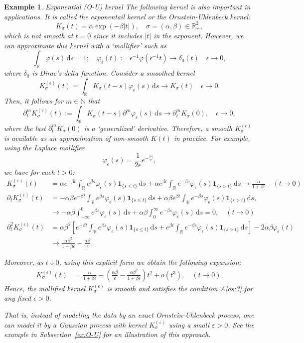 \documentclass[a4paper,10pt,twoside]{article}
\newtheorem{example}{Example}[section]
\numberwithin{equation}{section}
\def\R{\mathbb{R}}
\def\N{\mathbb{N}}
\def\e{{\epsilon}}
\def\d{\delta}
\def\l{\left}
\def\r{\right}
\def\a{\alpha}
\def\b{\beta}
\def\s{\sigma}
\def\vp{\varphi}
\def\p{\partial}
\def\df{\mathrm{d}}
\begin{document}
\begin{example} \label{ex:ou-kernel}{Exponential (O-U) kernel} 
The following kernel is also important in applications. 
It is called the {\it exponentail kernel} or the {\it Ornstein-Uhlenbeck kernel}: 
\[
K_\s(t) = \a  \exp\l(-\b|t|\r),\quad \s=(\a,\b) \in \R_+^2,
\]
which is not smooth at $t=0$ since it includes $|t|$ in the exponent. However, we can approximate this kernel with a {\it `mollifier'}  such as
\[
\int_\R \vp(s)\,\df s = 1; \quad \vp_\e(t):=\e^{-1} \vp\l(\e^{-1} t\r) \to \d_0(t)\quad \e\to 0, 
\]
where $\d_0$ is Dirac's delta function. Consider a {\it smoothed kernel}
\[
K_\s^{(\e)}(t) = \int_\R K_\s(t-s)\vp_\e(s)\,\df s \to K_\s(t) \quad \e\to 0. 
\]
Then, it follows for $m\in \N$ that 
\[
\p_t^m K_\s^{(\e)}(t) := \int_\R K_\s(t-s)\p^m \vp_\e(s)\,\df s \to \p_t^mK_\s(0),\quad \e\to 0, 
\]
where the last $ \p_t^mK_\s(0)$ is a `generalized' derivative. 
Therefore, a smooth $K_\s^{(\e)}$ is available as an approximation of non-smooth $K(t)$ in practice. 
For example, using the Laplace mollifier 
\[
\varphi_\e(s) = \frac{1}{2\e} e^{-\frac{|s|}{\e}}, 
\]
we have for each $t > 0$:
\begin{align*}
K_\s^{(\e)}(t) &= \a e^{-\b t} \int_{\R} e^{\b s} \vp_\e(s) \mathbf{1}_{\{s \le t\}}\,\df s + \a e^{\b t} \int_{\R} e^{-\b s} \vp_\e(s) \mathbf{1}_{\{s > t\}}\,\df s\to \frac{\a}{1 + \b\e}  \quad (t\to 0) \\
\p_t K_\s^{(\e)}(t) &= -\a\b e^{-\b t} \int_{\R} e^{\b s} \vp_\e(s) \mathbf{1}_{\{s \le t\}}\,\df s + \a\b e^{\b t} \int_{\R} e^{-\b s} \vp_\e(s) \mathbf{1}_{\{s > t\}}\,\df s, \\
&\to  -\a\b \int_{-\infty}^0 e^{\b s}\vp_\e(s)\,\df s + \a\b \int_0^\infty e^{-\b s}\vp_\e(s)\,\df s =0,  \quad (t\to 0) \\
\p_t^2 K_\s^{(\e)}(t) &= \a\b^2 \l[ e^{-\b t} \int_{\R} e^{\b s} \vp_\e(s) \mathbf{1}_{\{s \le t\}}\,\df s + e^{\b t} \int_{\R} e^{-\b s} \vp_\e(s) \mathbf{1}_{\{s > t\}}\,\df s \r] - 2\a\b \vp_\e(t) \\
&\to \frac{\a\b^2}{1+\b\e} - \frac{\a\b}{\e}. 
\end{align*}

Moreover, as $t \downarrow 0$, using this explicit form we obtain the following expansion:
\begin{align*}
K_\s^{(\e)}(t) &=\frac{\a}{1 + \b\e} -  \l(\frac{\a\b}{\e} - \frac{\a\b^2}{1+\b\e}\r) t^2 + o(t^3), \quad (t\to 0). 
\end{align*}
Hence, the mollified kernel $K_\s^{(\e)}$ is smooth and satisfies the condition A\ref{as:3} for any fixed $\e > 0$. 

That is, instead of modeling the data by an exact Ornstein-Uhlenbeck process, one can model it by a Gaussian process with kernel $K_\sigma^{(\varepsilon)}$ using a small $\varepsilon > 0$. See the example in Subsection~\ref{ex:O-U} for an illustration of this approach.

\end{example}
\end{document}
